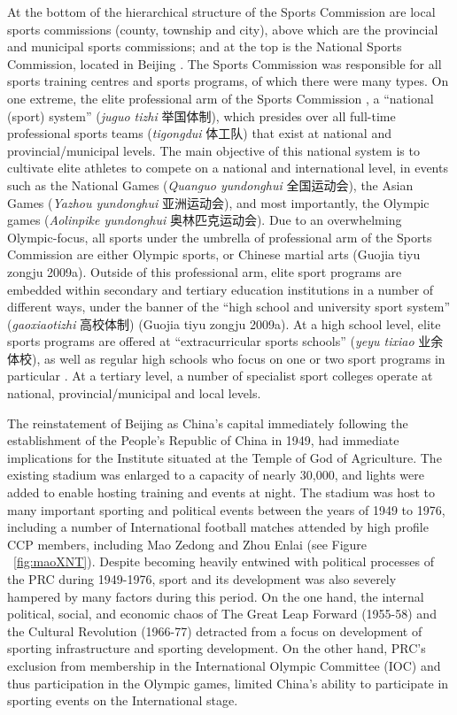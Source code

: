 At the bottom of the hierarchical structure of the Sports Commission are local sports commissions (county, township and city), above which are the provincial and municipal sports commissions; and at the top is the National Sports Commission, located in Beijing \citep[59]{Brownell1995}.  The Sports Commission was responsible for all sports training centres and sports programs, of which there were many types.  On one extreme, the elite professional arm of the Sports Commission , a ``national (sport) system'' (\textit{juguo tizhi} 举国体制), which presides over all full-time professional sports teams (\textit{tigongdui} 体工队) that exist at national and provincial/municipal levels.  The main objective of this national system is to cultivate elite athletes to compete on a national and international level, in events such as the National Games (\textit{Quanguo yundonghui} 全国运动会), the Asian Games (\textit{Yazhou yundonghui} 亚洲运动会), and most importantly, the Olympic games (\textit{Aolinpike yundonghui} 奥林匹克运动会).  Due to an overwhelming Olympic-focus, all sports under the umbrella of professional arm of the Sports Commission are either Olympic sports, or Chinese martial arts (Guojia tiyu zongju 2009a).  Outside of this professional arm, elite sport programs are embedded within secondary and tertiary education institutions in a number of different ways, under the banner of the ``high school and university sport system'' (\textit{gaoxiaotizhi} 高校体制) (Guojia tiyu zongju 2009a).  At a high school level, elite sports programs are offered at ``extracurricular sports schools'' (\textit{yeyu tixiao} 业余体校), as well as regular high schools who focus on one or two sport programs in particular \citep[59]{Brownell1995}. At a tertiary level, a number of specialist sport colleges operate at national, provincial/municipal and local levels.

The reinstatement of Beijing as China's capital immediately following the establishment of the People's Republic of China in 1949, had immediate implications for the Institute situated at the Temple of God of Agriculture.  The existing stadium was enlarged to a capacity of nearly 30,000, and lights were added to enable hosting training and events at night.  The stadium was host to many important sporting and political events between the years of 1949 to 1976, including a number of International football matches attended by high profile CCP members, including Mao Zedong and Zhou Enlai (see Figure ~\ref{fig:maoXNT}).  Despite becoming heavily entwined with political processes of the PRC during 1949-1976, sport and its development was also severely hampered by many factors during this period.  On the one hand, the internal political, social, and economic chaos of The Great Leap Forward (1955-58) and the Cultural Revolution (1966-77) detracted from a focus on development of sporting infrastructure and sporting development.  On the other hand, PRC's exclusion from membership in the International Olympic Committee (IOC) and thus participation in the Olympic games, limited China's ability to participate in sporting events on the International stage.

